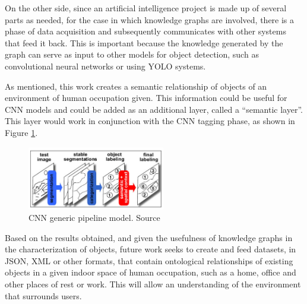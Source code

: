 On the other side, since an artificial intelligence project is made up of 
several parts as needed, for the case in which knowledge graphs are involved, 
there is a phase of data acquisition and subsequently communicates with other 
systems that feed it back. This is important because the knowledge generated by 
the graph can serve as input to other models for object detection, such as 
convolutional neural networks or using YOLO systems.

As mentioned, this work creates a semantic relationship of objects of an 
environment of human occupation given. This information could be useful for 
CNN models and could be added as an additional layer, called a 
``semantic layer''. This layer would work in conjunction with the CNN 
tagging phase, as shown in Figure \ref{fig:pipeline}.

\begin{figure}[H]
    \centering
    \includegraphics[width=6cm]{figures/pipeline.png}
    \caption{CNN generic pipeline model. Source \cite{Galleguillos2}}
    \label{fig:pipeline}
\end{figure}


Based on the results obtained, and given the usefulness of knowledge graphs 
in the characterization of objects, future work seeks to create and feed 
datasets, in JSON, XML or other formats, that contain ontological relationships 
of existing objects in a given indoor space of human occupation, such as a home, 
office and other places of rest or work. This will allow an understanding of 
the environment that surrounds users.

